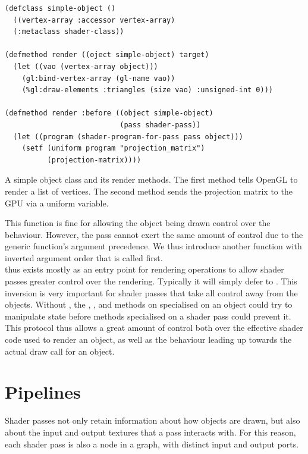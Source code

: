 \documentclass[format=sigconf]{acmart}
\begin{document}
\begin{listing}[h]
\begin{verbatim}
(defclass simple-object ()
  ((vertex-array :accessor vertex-array)
  (:metaclass shader-class))

(defmethod render ((oject simple-object) target)
  (let ((vao (vertex-array object)))
    (gl:bind-vertex-array (gl-name vao))
    (%gl:draw-elements :triangles (size vao) :unsigned-int 0)))

(defmethod render :before ((object simple-object)
                           (pass shader-pass))
  (let ((program (shader-program-for-pass pass object)))
    (setf (uniform program "projection_matrix")
          (projection-matrix))))
\end{verbatim}
\caption{A simple object class and its render methods. The first method tells OpenGL to render a list of vertices. The second method sends the projection matrix to the GPU via a uniform variable.}
\label{lst:simple-object}
\end{listing}

This function is fine for allowing the object being drawn control over the behaviour. However, the pass cannot exert the same amount of control due to the generic function's argument precedence. We thus introduce another function with inverted argument order that is called first. \\

 thus exists mostly as an entry point for rendering operations to allow shader passes greater control over the rendering. Typically it will simply defer to . This inversion is very important for shader passes that take all control away from the objects. Without , the , , and  methods on  specialised on an object could try to manipulate state before methods specialised on a shader pass could prevent it. \\

This protocol thus allows a great amount of control both over the effective shader code used to render an object, as well as the behaviour leading up towards the actual draw call for an object.

\section{Pipelines}\label{pipelines}
Shader passes not only retain information about how objects are drawn, but also about the input and output textures that a pass interacts with. For this reason, each shader pass is also a node in a graph, with distinct input and output ports.
\end{document}
